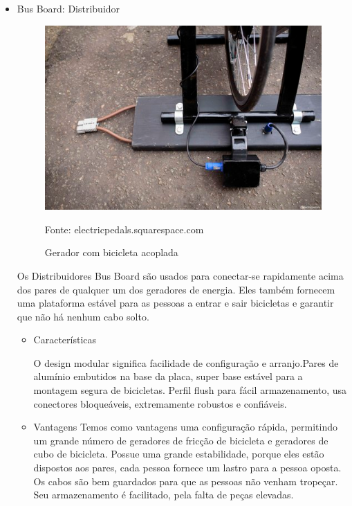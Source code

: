\pagebreak
\begin{itemize}
	\item Bus Board: Distribuidor
	
	\begin{figure}[H]
	 \centering
	\label{Bus Board: Distribuidor}
	 \includegraphics[keepaspectratio=true,scale=0.8]{interacao/11.png}
	 \caption{Gerador com bicicleta acoplada}
	 \small{Fonte: electricpedals.squarespace.com}
	\end{figure}
	
Os Distribuidores Bus Board são usados ​​para conectar-se rapidamente acima dos pares de qualquer um dos geradores de energia. Eles também fornecem uma plataforma estável para as pessoas a entrar e sair bicicletas e garantir que não há nenhum cabo solto.

	\begin{itemize}
	\item Características
	
	O design modular significa facilidade de configuração e arranjo.Pares de alumínio embutidos na base da placa, super base estável para a montagem segura de bicicletas. Perfil flush para fácil armazenamento, usa conectores bloqueáveis, extremamente robustos e confiáveis.				
	\end{itemize}	
			
	\begin{itemize}
	\item Vantagens
		Temos como vantagens uma configuração rápida, permitindo um grande número de geradores de fricção de bicicleta e geradores de cubo de bicicleta. Possue uma grande estabilidade, porque eles estão dispostos aos pares, cada pessoa fornece um lastro para a pessoa oposta. Os cabos são bem guardados para que as pessoas não venham tropeçar. Seu armazenamento é facilitado, pela falta de peças elevadas.	
	\end{itemize}		


\end{itemize}
